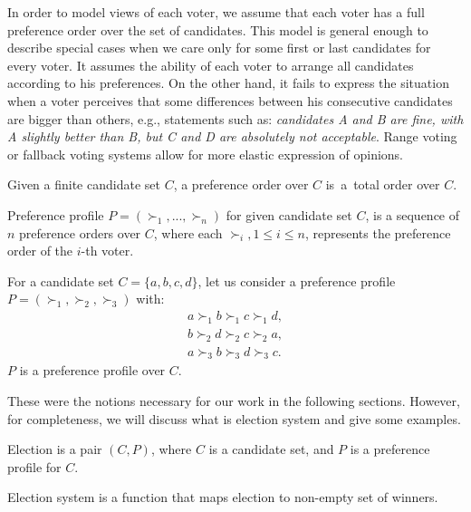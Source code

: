 In order to model views of each voter,
we assume that each voter has a full preference order over the set of candidates.
This model is general enough to describe special cases
when we care only for some first or last candidates for every voter.
It assumes the ability of each voter to arrange all candidates according to his preferences.
On the other hand, it fails to express the situation when a voter perceives that some differences
between his consecutive candidates are bigger than others, e.g., statements such as:
\textit{candidates A and B are fine, with A slightly better than B, but C and D are absolutely not acceptable}.
Range voting \cite{rangevoting} or fallback voting \cite{fallbackvoting} systems
allow for more elastic expression of opinions.

\begin{defn}
Given a finite candidate set $C$, a preference order over $C$
is~a~total order over $C$.
\end{defn}

\begin{defn}
Preference profile $P = (\succ_1, ... , \succ_n)$ for given candidate set $C$,
is a sequence of $n$ preference orders over $C$,
where each $\succ_i, 1 \leq i \leq n$, represents the preference order of the $i$-th voter.
\end{defn}

\begin{exmp} \label{example-election}
For a candidate set $C = \{a, b, c, d\}$,
let us consider a preference profile $P = (\succ_1, \succ_2, \succ_3)$ with:
\begin{align*}
a \succ_1 b \succ_1 c \succ_1 d, \\
b \succ_2 d \succ_2 c \succ_2 a,	\\
a \succ_3 b \succ_3 d \succ_3 c.
\end{align*}
$P$ is a preference profile over $C$.
\end{exmp}

These were the notions necessary for our work in the following sections.
However, for completeness, we will discuss what is election system and give some examples.

\begin{defn}[election]
Election is a pair $(C, P)$, where $C$ is a candidate set, and $P$ is a preference profile for $C$.
\end{defn}

\begin{defn}
Election system is a function that maps election to non-empty set of winners.
\end{defn}

